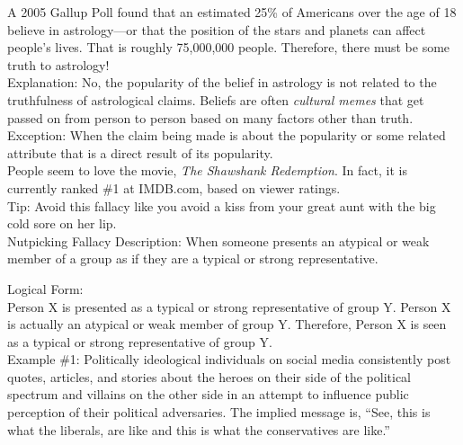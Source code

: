 \documentclass[a4paper,12pt,single,pdftex]{scrartcl}
\begin{document}
    
      A 2005 Gallup Poll found that an estimated 25\% of Americans over the age of 18 believe in astrology—or that the position of the stars and planets can affect people's lives.  That is roughly 75,000,000 people.  Therefore, there must be some truth to astrology!
    \\

    
      Explanation: No, the popularity of the belief in astrology is not related to the truthfulness of astrological claims.  Beliefs are often {\it cultural memes} that get passed on from person to person based on many factors other than truth. 
    \\

    
      Exception: When the claim being made is about the popularity or some related attribute that is a direct result of its popularity.
    \\

    
      People seem to love the movie, {\it The Shawshank Redemption}.  In fact, it is currently ranked \#1 at IMDB.com, based on viewer ratings.
    \\

    
      Tip: Avoid this fallacy like you avoid a kiss from your great aunt with the big cold sore on her lip.
    \\

  

Nutpicking Fallacy
    Description: When someone presents an atypical or weak member of a group as if they are a typical or strong representative.

    
      Logical Form:
    \\

    
      Person X is presented as a typical or strong representative of group Y. \newline
Person X is actually an atypical or weak member of group Y. \newline
Therefore, Person X is seen as a typical or strong representative of group Y.
    \\

    
      Example \#1: Politically ideological individuals on social media consistently post quotes, articles, and stories about the heroes on their side of the political spectrum and villains on the other side in an attempt to influence public perception of their political adversaries. The implied message is, “See, this is what the liberals, are like and this is what the conservatives are like.”
    \\
\end{document}
